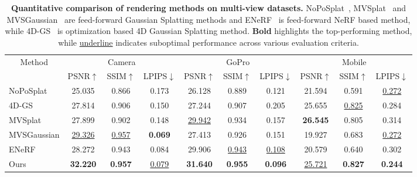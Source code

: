
\begin{table}[ht!]
\small

\centering
\begin{tabular}{l|ccc|ccc|ccc}
\toprule
\multicolumn{1}{c}{\multirow{1}[6]{*}{Method}} & \multicolumn{3}{c}{Camera} & \multicolumn{3}{c}{GoPro} & \multicolumn{3}{c}{Mobile} \\

\cmidrule{2-10} \multicolumn{1}{c}{} & PSNR$\uparrow$ & SSIM$\uparrow$ & \multicolumn{1}{c}{LPIPS$\downarrow$} & PSNR$\uparrow$ & SSIM$\uparrow$  & \multicolumn{1}{c}{LPIPS$\downarrow$} & PSNR$\uparrow$ & SSIM$\uparrow$ & \multicolumn{1}{c}{LPIPS$\downarrow$} \\ \midrule

NoPoSplat  & 25.035 & 0.866 & 0.173 & 26.128 & 0.889 & 0.121 & 21.594 & 0.591 & \underline{0.272}  \\
4D-GS  & 27.814 & 0.906 & 0.150 & 27.244 & 0.907 & 0.205 & 25.655 & \underline{0.825} & 0.284  \\
MVSplat     & 27.899 & 0.902 & 0.148 & \underline{29.942} & 0.934 & 0.157 & \textbf{26.545} & 0.805 &  0.314  \\
MVSGaussian & \underline{29.326} & \underline{0.957} & \textbf{0.069} & 27.413 & 0.926 & 0.151 & 19.927 & 0.683 & \underline{0.272}   \\
ENeRF  & 28.272 & 0.943 & 0.084 & 29.906 & \underline{0.943} & \underline{0.108} & 20.579 & 0.640 & 0.302   \\
Ours   & \textbf{32.220} & \textbf{0.957} & \underline{0.079} & \textbf{31.640} & \textbf{0.955} & \textbf{0.096} & \underline{25.721} & \textbf{0.827} & \textbf{0.244} \\
\bottomrule
\end{tabular}
\vspace{-1mm}
\caption{\textbf{Quantitative comparison of rendering methods on multi-view datasets.} NoPoSplat~\cite{ye2024nopose}, MVSplat~\cite{chen2024mvsplat} and MVSGaussian~\cite{liu2024mvsgaussian} are feed-forward Gaussian Splatting methods and ENeRF~\cite{lin2022enerf} is feed-forward NeRF based method, while 4D-GS~\cite{Wu2024_4dgs} is optimization based 4D Gaussian Splatting method. \textbf{Bold} highlights the top-performing method, while \underline{underline} indicates suboptimal performance across various evaluation criteria.}
\vspace{-2mm}
\label{tab:num_compare_bg}
\end{table}
